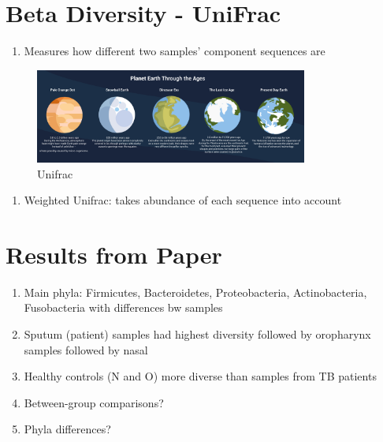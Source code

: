 \documentclass[
]{book}
\providecommand{\tightlist}{%
  \setlength{\itemsep}{0pt}\setlength{\parskip}{0pt}}
\begin{document}
\hypertarget{beta-diversity---unifrac}{%
\section{Beta Diversity - UniFrac}\label{beta-diversity---unifrac}}

\begin{enumerate}
\def\labelenumi{\arabic{enumi}.}
\tightlist
\item
  Measures how different two samples' component sequences are
\end{enumerate}

\begin{figure}
\centering
\includegraphics[width=0.8\textwidth,height=\textheight]{./Figures/Planets.png}
\caption{Unifrac}
\end{figure}

\begin{enumerate}
\def\labelenumi{\arabic{enumi}.}
\setcounter{enumi}{1}
\tightlist
\item
  Weighted Unifrac: takes abundance of each sequence into account
\end{enumerate}

\hypertarget{results-from-paper}{%
\section{Results from Paper}\label{results-from-paper}}

\begin{enumerate}
\def\labelenumi{\arabic{enumi}.}
\tightlist
\item
  Main phyla: Firmicutes, Bacteroidetes, Proteobacteria, Actinobacteria, Fusobacteria with differences bw samples
\item
  Sputum (patient) samples had highest diversity followed by oropharynx samples followed by nasal
\item
  Healthy controls (N and O) more diverse than samples from TB patients
\item
  Between-group comparisons?
\item
  Phyla differences?
\end{enumerate}
\end{document}
